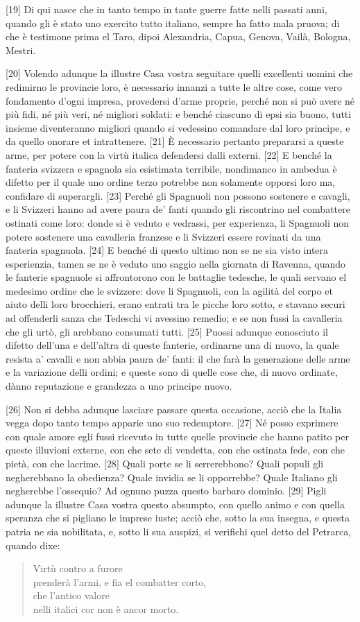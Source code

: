 {[}19{]} Di qui nasce che in tanto tempo in tante guerre fatte nelli passati  anni, quando gli è stato uno exercito tutto italiano, sempre ha fatto mala pruova; di che è testimone prima el Taro, dipoi Alexandria, Capua, Genova, Vailà, Bologna, Mestri.

\quebra

{[}20{]}  Volendo adunque la illustre Casa vostra seguitare quelli excellenti
uomini che redimirno le provincie loro, è necessario innanzi a tutte
le altre cose, come vero fondamento d'ogni impresa, provedersi d'arme
proprie, perché non si può avere né più fidi, né più veri, né migliori
soldati: e benché ciascuno di epsi sia buono, tutti insieme
diventeranno migliori quando si vedessino comandare dal loro principe,
e da quello onorare et intrattenere. {[}21{]} È necessario pertanto
prepararsi a queste arme, per potere con la virtù italica defendersi
dalli externi. {[}22{]} E benché la fanteria svizzera e spagnola sia
esistimata terribile, nondimanco in ambedua è difetto per il quale uno
ordine terzo potrebbe non solamente opporsi loro ma, confidare di
superargli. {[}23{]} Perché gli Spagnuoli non possono sostenere e
cavagli, e li Svizzeri hanno ad avere paura de' fanti quando gli
riscontrino nel combattere ostinati come loro: donde si è veduto e
vedrassi, per experienza, li Spagnuoli non potere sostenere una
cavalleria franzese e li Svizzeri essere rovinati da una fanteria
spagnuola. {[}24{]} E benché di questo ultimo non se ne sia visto
intera esperienzia, tamen se ne è veduto uno saggio nella giornata di
Ravenna, quando le fanterie spagnuole si affrontorono con le battaglie
tedesche, le quali servano el medesimo ordine che le svizzere: dove li
Spagnuoli, con la agilità del corpo et aiuto delli loro brocchieri,
erano entrati tra le picche loro sotto, e stavano securi ad offenderli
sanza che Tedeschi vi avessino remedio; e se non fussi la cavalleria
che gli urtò, gli arebbano consumati tutti. {[}25{]} Puossi adunque
conosciuto il difetto dell'una e dell'altra di queste fanterie,
ordinarne una di nuovo, la quale resista a' cavalli e non abbia paura
de' fanti: il che farà la generazione delle arme e la variazione delli
ordini; e queste sono di quelle cose che, di nuovo ordinate, dànno
reputazione e grandezza a uno principe nuovo.


{[}26{]} Non si debba adunque lasciare passare questa occasione, acciò
che la Italia vegga dopo tanto tempo apparie uno suo redemptore.
{[}27{]} Né posso exprimere con quale amore egli fussi ricevuto in tutte
quelle provincie che hanno patito per queste illuvioni externe, con che
sete di vendetta, con che ostinata fede, con che pietà, con che lacrime.
{[}28{]} Quali porte se li serrerebbono? Quali populi gli negherebbano
la obedienza? Quale invidia se li opporrebbe? Quale Italiano gli
negherebbe l'ossequio? Ad ognuno puzza questo barbaro dominio. {[}29{]}
Pigli adunque la illustre Casa vostra questo absumpto, con quello animo
e con quella speranza che si pigliano le imprese iuste; acciò che, sotto
la sua insegna, e questa patria ne sia nobilitata, e, sotto li sua
auspizi, si verifichi quel detto del Petrarca, quando dixe:


\begin{verse}
Virtù contro a furore\\
prenderà l'armi, e fia el combatter corto,\\
che l'antico valore\\
nelli italici cor non è ancor morto.
\end{verse}
